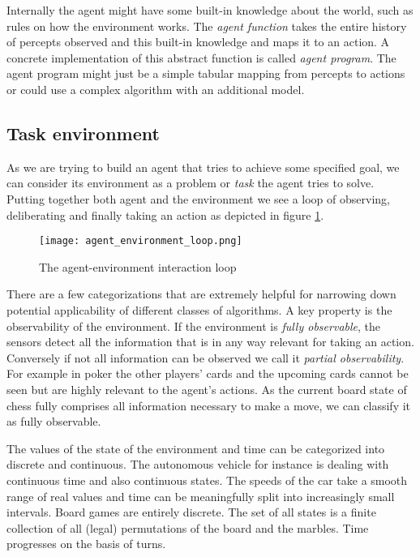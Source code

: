 Internally the agent might have some built-in knowledge about the world, such as rules on how the environment works. The \textit{agent function} takes the entire history of percepts observed and this built-in knowledge and maps it to an action. A concrete implementation of this abstract function is called \textit{agent program}. The agent program might just be a simple tabular mapping from percepts to actions or could use a complex algorithm with an additional model.

\subsection{Task environment}
\label{environment}

As we are trying to build an agent that tries to achieve some specified goal, we can consider its environment as a problem or \textit{task} the agent tries to solve. Putting together both agent and the environment we see a loop of observing,  deliberating and finally taking an action as depicted in figure \ref{agent_environment_loop}.

\begin{figure}
    \centering
    \texttt{[image: agent\_environment\_loop.png]}
    \caption{The agent-environment interaction loop \cite[cf. p. 96]{russell_artificial_2021}}
    \label{agent_environment_loop}
\end{figure}

There are a few categorizations that are extremely helpful for narrowing down potential applicability of different classes of algorithms. A key property is the observability of the environment. If the environment is \textit{fully observable}, the sensors detect all the information that is in any way relevant for taking an action. Conversely if not all information can be observed we call it \textit{partial observability}. For example in poker the other players' cards and the upcoming cards cannot be seen but are highly relevant to the agent's actions. As the current board state of chess fully comprises all information necessary to make a move, we can classify it as fully observable.

The values of the state of the environment and time can be categorized into discrete and continuous. The autonomous vehicle for instance is dealing with continuous time and also continuous states. The speeds of the car take a smooth range of real values and time can be meaningfully split into increasingly small intervals. Board games are entirely discrete. The set of all states is a finite collection of all (legal) permutations of the board and the marbles. Time progresses on the basis of turns.

